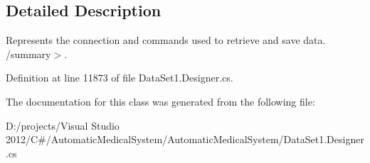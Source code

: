 \subsection{Detailed Description}
Represents the connection and commands used to retrieve and save data. /summary$>$. 

Definition at line 11873 of file DataSet1.Designer.cs.

The documentation for this class was generated from the following file:\begin{CompactItemize}
\item 
D:/projects/Visual Studio 2012/C\#/AutomaticMedicalSystem/AutomaticMedicalSystem/DataSet1.Designer.cs\end{CompactItemize}
